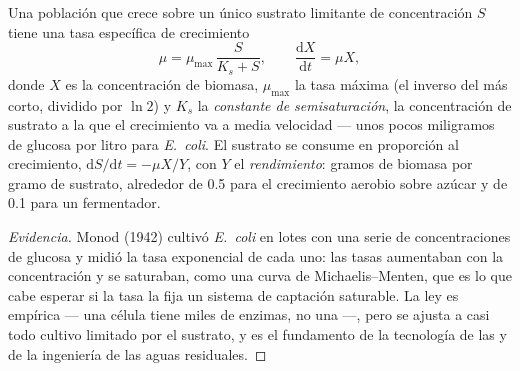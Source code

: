 \begin{theorem}\label{thm:b2:microbial-metabolism:monod}
Una población que crece sobre un único sustrato limitante de
concentración $S$ tiene una tasa específica de crecimiento
\[
\mu = \mu_{\max}\,\frac{S}{K_s + S}, \qquad \frac{\mathrm{d}X}{\mathrm{d}t} = \mu X,
\]
donde $X$ es la concentración de biomasa, $\mu_{\max}$ la tasa máxima
(el inverso del  más corto, dividido por $\ln 2$) y
$K_s$ la \emph{constante de semisaturación}, la concentración de
sustrato a la que el crecimiento va a media velocidad --- unos pocos
miligramos de glucosa por litro para \emph{E.~coli}. El sustrato se
consume en proporción al crecimiento, $\mathrm{d}S/\mathrm{d}t =
-\mu X/Y$, con $Y$ el \emph{rendimiento}: gramos de biomasa por gramo de
sustrato, alrededor de \num{0.5} para el crecimiento aerobio sobre azúcar
y de \num{0.1} para un fermentador.
\end{theorem}
\begin{proof}[Evidencia]
Monod (1942) cultivó \emph{E.~coli} en lotes con una serie de
concentraciones de glucosa y midió la tasa exponencial de cada uno: las
tasas aumentaban con la concentración y se saturaban, como una curva de
Michaelis--Menten, que es lo que cabe esperar si la tasa la fija un
sistema de captación saturable. La ley es empírica --- una célula tiene
miles de enzimas, no una ---, pero se ajusta a casi todo cultivo limitado
por el sustrato, y es el fundamento de la tecnología de las
 y de la ingeniería de las aguas residuales.
\end{proof}

